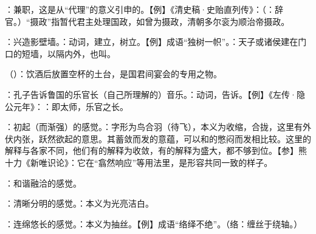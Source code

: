 {\item {}：兼职，这是从“代理”的意义引申的。【例】《清史稿·史贻直列传》：（：辞官。）“摄政”指暂代君主处理国政，如曾为摄政，清朝多尔衮为顺治帝摄政。
\item {}：兴造影壁墙。：动词，建立，树立。【例】成语“独树一帜”。：天子或诸侯建在门口的短墙，以隔内外，也叫。
\item {}（）：饮酒后放置空杯的土台，是国君间宴会的专用之物。
}
{}


{
\item {}：孔子告诉鲁国的乐官长（自己所理解的）音乐。：动词，告诉。【例】《左传·隐公元年》：：即太师，乐官之长。
\item {}：初起（而渐强）的感觉。：字形为鸟合羽（待飞），本义为收缩，合拢，这里有外伏内张，跃然欲起的意思。其蓄敛而发的意蕴，可以和的憋闷而发相比较。这里的解释与各家不同，他们有的解释为收敛，有的解释为盛大，都不够到位。【参】熊十力《新唯识论》：它在“翕然响应”等用法里，是形容共同一致的样子。
\item {}：和谐融洽的感觉。
\item {}：清晰分明的感觉。：本义为光亮洁白。
\item {}：连绵悠长的感觉。：本义为抽丝。【例】成语“络绎不绝”。（络：缠丝于绕轴。）
}
{}


